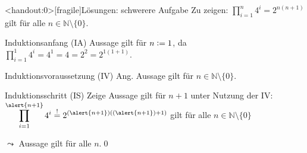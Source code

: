 {\begin{frame}<handout:0>[fragile]{Lösungen: schwerere Aufgabe}
     Zu zeigen: $\displaystyle\prod_{i=1}^{n} 4^i = 2^{n(n+1)}$ gilt für alle $n \in \mathbb{N}\setminus \{0\}$.
    \begin{alertblock}{Induktionsanfang (IA)}
        Aussage gilt für $n\vcentcolon= 1$, da $\displaystyle\prod_{i=1}^{1} 4^i = 4^1 = 4 = 2^2 = 2^{1(1+1)}$.
    \end{alertblock}
    \begin{alertblock}{Induktionsvoraussetzung (IV)}
        Ang. Aussage gilt für $n \in\mathbb{N}\setminus \{0\}$.
    \end{alertblock}
    \begin{alertblock}{Induktionsschritt (IS)}
        Zeige Aussage gilt für $n+1$ unter Nutzung der IV:\\
        $\displaystyle\prod_{i=1}^{\alert{n+1}} 4^i \overset{!}{=} 2^{(\alert{n+1})((\alert{n+1})+1)}$ gilt für alle $n \in \mathbb{N}\setminus \{0\}$
    \end{alertblock}
    \alert{$\leadsto$ Aussage gilt für alle $n$.}\qed
\end{frame}
}

